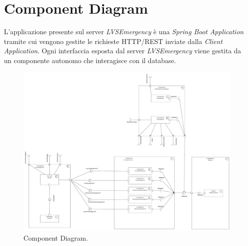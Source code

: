 \section{Component Diagram}
L'applicazione presente sul server \textit{LVSEmergency} è una \textit{Spring Boot Application} tramite cui vengono gestite le richieste HTTP/REST inviate dalla \textit{Client Application}. Ogni interfaccia esposta dal server \textit{LVSEmergency} viene gestita da un componente autonomo che interagisce con il database.

\begin{figure}[h!]
	\centering
	\includegraphics[width=1\linewidth]{./Iterazione 1/OtherFiles/UML - Component View}
	\caption{Component Diagram.}
	\label{fig:ComponentDiagram}
\end{figure}